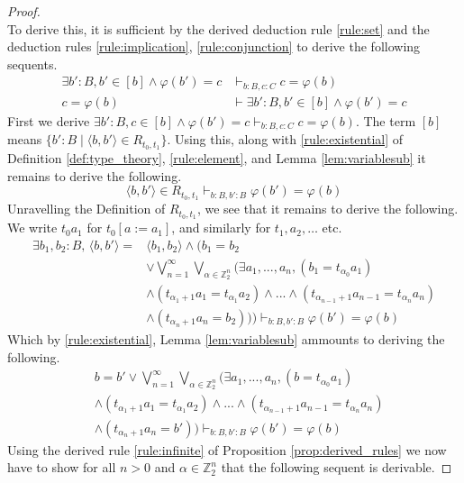 \documentclass{tac}
\newcommand{\bb}[1]{\mathbb{#1}}
\begin{document}
\begin{proof}
\begin{equation}
		\end{equation}
		To derive this, it is sufficient by the derived deduction rule \eqref{rule:set} and the deduction rules \eqref{rule:implication}, \eqref{rule:conjunction} to derive the following sequents.
		\begin{align}
			\exists b':B, b' \in [b] \wedge \varphi(b') = c&\vdash_{b : B, c:C} c = \varphi(b)\\
			c = \varphi(b) &\vdash \exists b':B, b' \in [b] \wedge \varphi(b') = c
		\end{align}
		First we derive $\exists b':B, c \in [b] \wedge \varphi(b') = c\vdash_{b : B, c:C} c = \varphi(b)$. The term $[b]$ means $\lbrace b' :B \mid \langle b,b'\rangle \in R_{t_0,t_1}\rbrace$. Using this, along with \eqref{rule:existential} of Definition \ref{def:type_theory}, \eqref{rule:element}, and Lemma \ref{lem:variablesub} it remains to derive the following.
		\begin{equation}
			\langle b,b'\rangle \in R_{t_0,t_1} \vdash_{b:B,b':B} \varphi(b') = \varphi(b)
		\end{equation}
		Unravelling the Definition of $R_{t_0,t_1}$, we see that it remains to derive the following. We write $t_0a_1$ for $t_0[a := a_1]$, and similarly for $t_1, a_2,\ldots$ etc.
		\begin{align*}
			\exists b_1, b_2 : B\text{, }\langle b,b'\rangle = &\langle b_1, b_2 \rangle \wedge \Big(b_1 = b_2\\
			&\vee \bigvee_{n = 1}^\infty\bigvee_{\alpha \in \bb{Z}_2^n}\big( \exists a_1,...,a_n, (b_1 = t_{\alpha_0}a_1)\\
			&\wedge (t_{\alpha_1 + 1}a_1 = t_{\alpha_1}a_2) \wedge ... \wedge (t_{\alpha_{n-1}+1}a_{n-1} = t_{\alpha_{n}}a_{n})\\
			&\wedge (t_{\alpha_{n}+1}a_{n} = b_2)\big)\Big) \vdash_{b:B,b':B} \varphi(b') = \varphi(b)
		\end{align*}
		Which by \eqref{rule:existential}, Lemma \ref{lem:variablesub} ammounts to deriving the following.
		\begin{align*}
			&b = b' \vee \bigvee_{n = 1}^\infty\bigvee_{\alpha \in \bb{Z}_2^n}\big( \exists a_1,...,a_n, (b = t_{\alpha_0}a_1)\\
			&\wedge (t_{\alpha_1 + 1}a_1 = t_{\alpha_1}a_2) \wedge ... \wedge (t_{\alpha_{n-1}+1}a_{n-1} = t_{\alpha_{n}}a_{n})\\
			&\wedge (t_{\alpha_{n}+1}a_{n} = b')\big) \vdash_{b:B,b':B} \varphi(b') = \varphi(b)
		\end{align*}
		Using the derived rule \eqref{rule:infinite} of Proposition \ref{prop:derived_rules} we now have to show for all $n >0$ and $\alpha \in \bb{Z}_2^n$ that the following sequent is derivable.

\end{proof}
\end{document}
